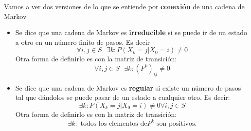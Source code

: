 Vamos a ver dos versiones de lo que se entiende por \textbf{conexión} de una cadena de Markov
\begin{itemize}
	\item \begin{defn}[Irreducible]
		Se dice que una cadena de Markov es \textbf{irreducible} si se puede ir de un estado a otro en un número finito de pasos. Es decir
		$$\forall i,j \in S\text{    }\exists k : P(X_k = j| X_0 = i) \neq 0$$
		Otra forma de definirlo es con la matriz de transición:
		$$\forall i,j \in S \text{    }\exists k: (P^k)_{ij} \neq 0$$
	\end{defn}
	\item \begin{defn}[Regular]
		Se dice que una cadena de Markov es \textbf{regular} si existe un número de pasos tal que dándolos se puede pasar de un estado a cualquier otro. Es decir:
		$$ \exists k : P(X_k = j| X_0 = i) \neq 0  \forall i,j \in S $$
		Otra forma de definirlo es con la matriz de transición:
		$$\exists k : \text{ todos los elementos de} P^k \text{ son positivos.}$$
	\end{defn}
\end{itemize}





